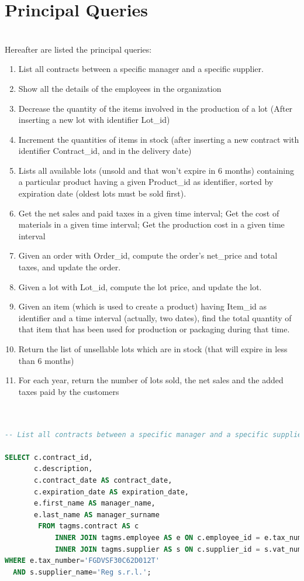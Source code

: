 \section{Principal Queries}
\\
Hereafter are listed the principal queries:
\begin{enumerate}
    \item List all contracts between a specific manager and a specific supplier.
    \item Show all the details of the employees in the organization
    \item Decrease the quantity of the items involved in the production of a lot (After inserting a new lot with identifier Lot\_id)
    \item Increment the quantities of items in stock (after inserting a new contract with identifier Contract\_id, and in the delivery date)
    \item Lists all available lots (unsold and that won't expire in 6 months) containing a particular product having a given Product\_id as identifier, sorted by expiration date (oldest lots must be sold first).
    \item Get the net sales and paid taxes in a given time interval; Get the cost of materials in a given time interval; Get the production cost in a given time interval
    \item Given an order with Order\_id, compute the order's net\_price and total taxes, and update the order.
    \item Given a lot with Lot\_id, compute the lot price, and update the lot.
    \item Given an item (which is used to create a product) having Item\_id as identifier and a time interval (actually, two dates), find the total quantity of that item that has been used for production or packaging during that time.
    \item Return the list of unsellable lots which are in stock (that will expire in less than 6 months)
    \item For each year, return the number of lots sold, the net sales and the added taxes paid by the customers
\end{enumerate}

\begin{lstlisting}[language=SQL,
keywordstyle=\color{blue},
stringstyle=\color{mauve},
showstringspaces=false,
breaklines=true,
basicstyle=\ttfamily\footnotesize]


-- List all contracts between a specific manager and a specific supplier.

SELECT c.contract_id,
       c.description,
       c.contract_date AS contract_date,
       c.expiration_date AS expiration_date,
       e.first_name AS manager_name,
       e.last_name AS manager_surname
		FROM tagms.contract AS c
		    INNER JOIN tagms.employee AS e ON c.employee_id = e.tax_number
		    INNER JOIN tagms.supplier AS s ON c.supplier_id = s.vat_number
WHERE e.tax_number='FGDVSF30C62D012T'
  AND s.supplier_name='Reg s.r.l.';
  
\end{lstlisting}

